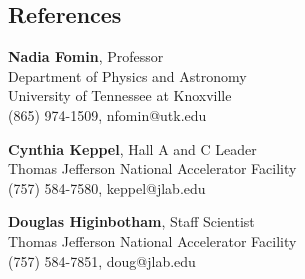 \documentclass[12pt,letterpaper]{article}
\begin{document}
\subsection*{References}
\begin{multicols}{2}
	{\noindent\bf{Nadia Fomin}}, Professor\\
	Department of Physics and Astronomy\\ 
	University of Tennessee at Knoxville\\
	(865) 974-1509, nfomin@utk.edu\\
	\columnbreak
	
	{\noindent\bf{Cynthia Keppel}}, Hall A and C Leader\\
	Thomas Jefferson National Accelerator Facility\\
	(757) 584-7580, keppel@jlab.edu\\
\end{multicols}
	{\noindent\bf{Douglas Higinbotham}}, Staff Scientist\\
	Thomas Jefferson National Accelerator Facility\\
	(757) 584-7851, doug@jlab.edu\\
\fi
		

	

\iffalse
\hrule

\subsection*{Interests}

	Football, coaching, programming, boating, traveling,
\fi
\end{document}
